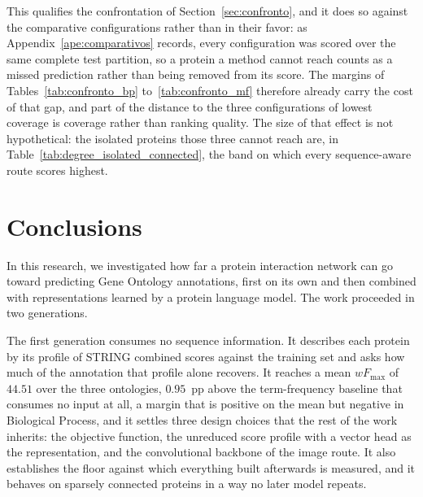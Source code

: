 \documentclass[Ingles]{ic-tese-v3}
\begin{document}
This qualifies the confrontation of Section~\ref{sec:confronto}, and it does so against the comparative configurations rather than in their favor: as Appendix~\ref{ape:comparativos} records, every configuration was scored over the same complete test partition, so a protein a method cannot reach counts as a missed prediction rather than being removed from its score. The margins of Tables~\ref{tab:confronto_bp} to~\ref{tab:confronto_mf} therefore already carry the cost of that gap, and part of the distance to the three configurations of lowest coverage is coverage rather than ranking quality. The size of that effect is not hypothetical: the isolated proteins those three cannot reach are, in Table~\ref{tab:degree_isolated_connected}, the band on which every sequence-aware route scores highest.




\chapter{Conclusions}
\label{cap:conclusao}

In this research, we investigated how far a protein interaction network can go toward
predicting Gene Ontology annotations, first on its own and then combined with representations
learned by a protein language model. The work proceeded in two generations.

The first generation consumes no sequence information. It describes each protein by its
profile of STRING combined scores against the training set and asks how much of the
annotation that profile alone recovers. It reaches a mean $wF_{\max}$ of $44.51$ over the
three ontologies, $0.95$~pp above the term-frequency baseline that consumes no input at all,
a margin that is positive on the mean but negative in Biological Process, and it settles three design choices that the rest of the work inherits: the objective
function, the unreduced score profile with a vector head as the representation, and the
convolutional backbone of the image route. It also establishes the floor against which
everything built afterwards is measured, and it behaves on sparsely connected proteins in a
way no later model repeats.
\end{document}

